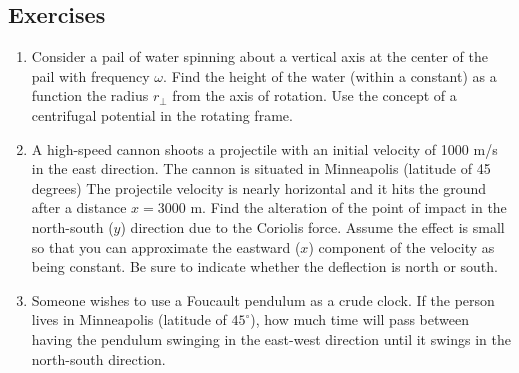 \subsection{Exercises}

\begin{enumerate}

\item Consider a pail of water spinning about a vertical axis at the center of the pail with frequency $\omega$. Find the height of the water (within a constant) as a function the radius $r_\perp$ from the axis of rotation. Use the concept of a centrifugal potential in the rotating frame.

\item A high-speed cannon shoots a projectile with an initial velocity
  of 1000 m/s in the east direction. The cannon is situated in
  Minneapolis (latitude of 45 degrees) The projectile velocity is
  nearly horizontal and it hits the ground after a distance $x=3000$
  m. Find the alteration of the point of impact in the north-south
  ($y$) direction due to the Coriolis force. Assume the effect is
  small so that you can approximate the eastward ($x$) component of
  the velocity as being constant. Be sure to indicate whether the
  deflection is north or south.

\item Someone wishes to use a Foucault pendulum as a crude clock. If the person lives in Minneapolis (latitude of $45^\circ$), how much time will pass between having the pendulum swinging in the east-west direction until it swings in the north-south direction.

\end{enumerate}
%
